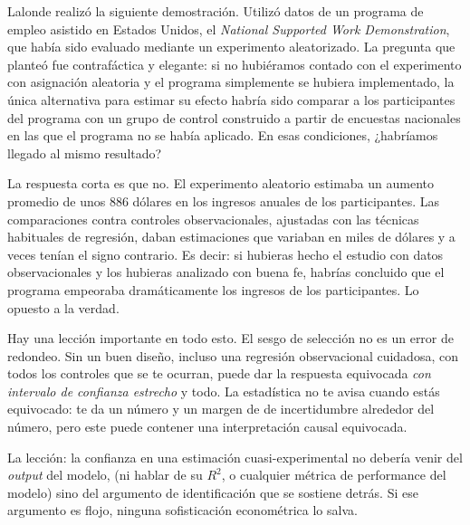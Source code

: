 \documentclass[
  letterpaper,
  DIV=11,
  numbers=noendperiod,
  oneside]{scrreprt}
\begin{document}
Lalonde realizó la siguiente demostración. Utilizó datos de un programa
de empleo asistido en Estados Unidos, el \emph{National Supported Work
Demonstration}, que había sido evaluado mediante un experimento
aleatorizado. La pregunta que planteó fue contrafáctica y elegante: si
no hubiéramos contado con el experimento con asignación aleatoria y el
programa simplemente se hubiera implementado, la única alternativa para
estimar su efecto habría sido comparar a los participantes del programa
con un grupo de control construido a partir de encuestas nacionales en
las que el programa no se había aplicado. En esas condiciones,
¿habríamos llegado al mismo resultado?

La respuesta corta es que no. El experimento aleatorio estimaba un
aumento promedio de unos 886 dólares en los ingresos anuales de los
participantes. Las comparaciones contra controles observacionales,
ajustadas con las técnicas habituales de regresión, daban estimaciones
que variaban en miles de dólares y a veces tenían el signo contrario. Es
decir: si hubieras hecho el estudio con datos observacionales y los
hubieras analizado con buena fe, habrías concluido que el programa
empeoraba dramáticamente los ingresos de los participantes. Lo opuesto a
la verdad.

\begin{tcolorbox}[enhanced jigsaw, breakable, rightrule=.15mm, colbacktitle=quarto-callout-warning-color!10!white, bottomtitle=1mm, arc=.35mm, titlerule=0mm, left=2mm, toprule=.15mm, leftrule=.75mm, colback=white, opacitybacktitle=0.6, opacityback=0, colframe=quarto-callout-warning-color-frame, bottomrule=.15mm, coltitle=black, toptitle=1mm, title=\textcolor{quarto-callout-warning-color}{\faExclamationTriangle}\hspace{0.5em}{Advertencia}]
Hay una lección importante en todo esto. El sesgo de selección no es un
error de redondeo. Sin un buen diseño, incluso una regresión
observacional cuidadosa, con todos los controles que se te ocurran,
puede dar la respuesta equivocada \emph{con intervalo de confianza
estrecho} y todo. La estadística no te avisa cuando estás equivocado: te
da un número y un margen de de incertidumbre alrededor del número, pero
este puede contener una interpretación causal equivocada.

La lección: la confianza en una estimación cuasi-experimental no debería
venir del \emph{output} del modelo, (ni hablar de su \(R^2\), o
cualquier métrica de performance del modelo) sino del argumento de
identificación que se sostiene detrás. Si ese argumento es flojo,
ninguna sofisticación econométrica lo salva.
\end{tcolorbox}
\end{document}
